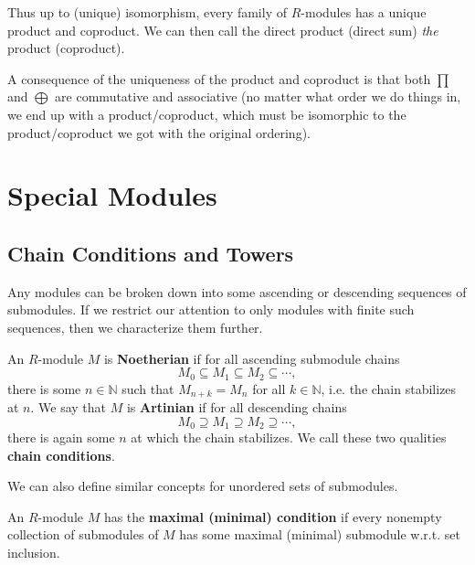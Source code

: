 \documentclass[twoside,10pt]{report}
\begin{document}
\begin{note}[]
	Thus up to (unique) isomorphism, every family of $R$-modules has a unique product and coproduct. We can then call the direct product (direct sum) \textit{the} product (coproduct).
\end{note}


A consequence of the uniqueness of the product and coproduct is that both $\prod$ and $\bigoplus$ are commutative and associative (no matter what order we do things in, we end up with a product/coproduct, which must be isomorphic to the product/coproduct we got with the original ordering).




\chapter{Special Modules}

\section{Chain Conditions and Towers}

Any modules can be broken down into some ascending or descending sequences of submodules. If we restrict our attention to only modules with finite such sequences, then we characterize them further.

\begin{defn}[]
An $R$-module $M$ is \textbf{Noetherian} if for all ascending submodule chains
\[
M_0 \subseteq M_1 \subseteq M_2 \subseteq \cdots,
\] there is some $n \in \mathbb{N}$ such that $M_{n+k} = M_{n}$ for all $k \in \mathbb{N}$, i.e. the chain stabilizes at $n$. We say that $M$ is \textbf{Artinian} if for all descending chains
\[
M_0 \supseteq M_1 \supseteq M_2 \supseteq \cdots,
\] there is again some $n$ at which the chain stabilizes. We call these two qualities \textbf{chain conditions}.
\end{defn}

We can also define similar concepts for unordered sets of submodules.
\begin{defn}[]
	An $R$-module $M$ has the \textbf{maximal (minimal) condition} if every nonempty collection of submodules of $M$ has some maximal (minimal) submodule w.r.t. set inclusion.
\end{defn}
\end{document}
